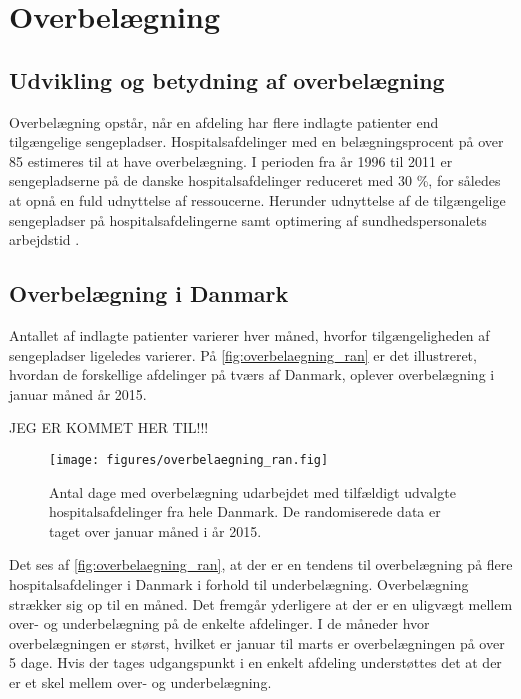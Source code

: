 \section{Overbelægning}

\subsection{Udvikling og betydning af overbelægning}
Overbelægning opstår, når en afdeling har flere indlagte patienter end tilgængelige sengepladser. \citep{denstoredanskeordbog1} Hospitalsafdelinger med en belægningsprocent på over 85 estimeres til at have overbelægning. I perioden fra år 1996 til 2011 er sengepladserne på de danske hospitalsafdelinger reduceret med 30 \%, for således at opnå en fuld udnyttelse af ressoucerne. Herunder udnyttelse af de tilgængelige sengepladser på hospitalsafdelingerne samt optimering af sundhedspersonalets arbejdstid \citep{Madsen2014}. 


\subsection{Overbelægning i Danmark}
Antallet af indlagte patienter varierer hver måned, hvorfor tilgængeligheden af sengepladser ligeledes varierer. På \autoref{fig:overbelaegning_ran} er det illustreret, hvordan de forskellige afdelinger  på tværs af Danmark, oplever overbelægning i januar måned år 2015.

JEG ER KOMMET HER TIL!!!

\begin{figure}[H]
\centering
\texttt{[image: figures/overbelaegning\_ran.fig]}
\caption{Antal dage med overbelægning udarbejdet med tilfældigt udvalgte hospitalsafdelinger fra hele Danmark. De randomiserede data er taget over januar måned i år 2015. \citep{SDS2015} } 
\label{fig:overbelaegning_ran}
\end{figure}

\noindent
Det ses af \autoref{fig:overbelaegning_ran}, at der er en tendens til overbelægning på flere hospitalsafdelinger i Danmark i forhold til underbelægning. Overbelægning strækker sig op til en måned. Det fremgår yderligere at der er en uligvægt mellem over- og underbelægning på de enkelte afdelinger. I de måneder hvor overbelægningen er størst, hvilket er januar til marts er overbelægningen på over 5 dage. Hvis der tages udgangspunkt i en enkelt afdeling understøttes det at der er et skel mellem over- og underbelægning.\citep{SDS2015} 

